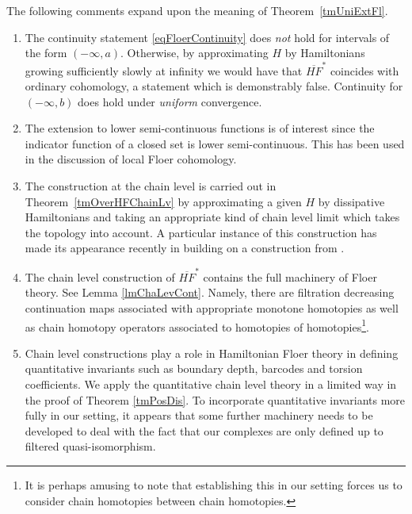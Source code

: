 \documentclass[11pt]{amsart}
\theoremstyle{definition}
\theoremstyle{remark}
\begin{document}
The following comments expand upon the meaning of Theorem~\ref{tmUniExtFl}.
\begin{enumerate}[wide, labelwidth=!, labelindent=10pt]
\item The continuity statement \eqref{eqFloerContinuity} does \textit{not} hold for intervals of the form $(-\infty,a)$. Otherwise, by approximating $H$ by Hamiltonians growing sufficiently slowly at infinity we would have that $\overline{HF}^*$ coincides with ordinary cohomology, a statement which is demonstrably false. Continuity for $(-\infty,b)$ does hold under \textit{uniform} convergence.
\item The extension to lower semi-continuous functions is of interest since the indicator function of a closed set is lower semi-continuous. This has been used in the discussion of local Floer cohomology.
\item The construction at the chain level is carried out in  Theorem~\ref{tmOverHFChainLv} by approximating a given $H$ by dissipative Hamiltonians and taking an appropriate kind of chain level limit which takes the topology into account. A particular instance of this construction has made its appearance recently in \cite{Venkatesh2017} building on a construction from \cite{abouzaidSeidel2010}. %
\item The chain level construction of $\overline{HF}^*$ contains the full machinery of Floer theory. See Lemma \ref{lmChaLevCont}. Namely, there are filtration decreasing continuation maps associated with appropriate monotone homotopies as well as chain homotopy operators associated to homotopies of homotopies\footnote{It is perhaps amusing to note that establishing this in our setting forces us to consider chain homotopies between chain homotopies.}.
\item Chain level constructions play a role in Hamiltonian Floer theory in defining quantitative invariants such as boundary depth, barcodes and torsion coefficients\cite{Usher2011,UsherZhang2016}. We apply the quantitative chain level theory in a limited way in the proof of Theorem \ref{tmPosDis}. To incorporate quantitative invariants more fully in our setting, it appears that some further machinery needs to be developed to deal with the fact that our complexes are only defined up to filtered quasi-isomorphism.

\end{enumerate}
\end{document}
